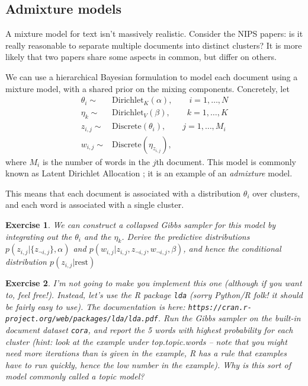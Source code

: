 \documentclass[twoside]{article}
\newcounter{lecnum}
\newtheorem{exercise}{Exercise}[lecnum]
\begin{document}
\subsection{Admixture models}
 A mixture model for text isn't massively realistic. Consider the NIPS papers: is it really reasonable to separate multiple documents into distinct clusters? It is more likely that two papers share some aspects in common, but differ on others.

 We can use a hierarchical Bayesian formulation to model each document using a mixture model, with a shared prior on the mixing components. Concretely, let
 $$\begin{aligned}
   \theta_i\sim& \mbox{Dirichlet}_K(\alpha),\qquad i=1,\dots,N\\
   \eta_k \sim& \mbox{Dirichlet}_V(\beta),\qquad k=1,\dots,K\\
   z_{i,j} \sim& \mbox{Discrete}(\theta_i),\qquad j=1,\dots, M_i\\
   w_{i,j} \sim& \mbox{Discrete}(\eta_{z_{i,j}}),\end{aligned}$$
 where $M_i$ is the number of words in the $j$th document. This model is commonly known as Latent Dirichlet Allocation \cite{BleNgJor2003}; it is an example of an \textit{admixture} model.
 
 This means that each document is associated with a distribution $\theta_i$ over clusters, and each word is associated with a single cluster.

 \begin{exercise}
   We can construct a collapsed Gibbs sampler for this model by integrating out the $\theta_i$ and the $\eta_k$. Derive the predictive distributions  $p(z_{i,j}|\{z_{\neg i,j}\}, \alpha)$ and $p(w_{i,j}|z_{i,j},z_{\neg i,j},w_{\neg i,j},\beta)$, and hence the conditional distribution $p(z_{i,j}|\mbox{rest})$
 \end{exercise}

 \begin{exercise}
   I'm not going to make you implement this one (although if you want to, feel free!). Instead, let's use the R package \texttt{lda} (sorry Python/R folk! it should be fairly easy to use). The documentation is here: \texttt{https://cran.r-project.org/web/packages/lda/lda.pdf}. Run the Gibbs sampler on the built-in document dataset \texttt{cora}, and report the 5 words with highest probability for each cluster (hint: look at the example under top.topic.words -- note that you might need more iterations than is given in the example, R has a rule that examples have to run quickly, hence the low number in the example). Why is this sort of model commonly called a topic model?
 \end{exercise}
 
\end{document}
